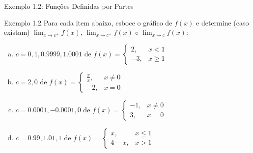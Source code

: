 \documentclass[10pt,aspectratio=169]{beamer}
\begin{document}
\begin{frame}{Exemplo 1.2: Funções Definidas por Partes}
    \transfade
    \begin{exampleblock}{Exemplo 1.2}
        Para cada item abaixo, esboce o gráfico de $f(x)$ e determine (caso existam) $\lim_{x \to c^+} f(x)$, $\lim_{x \to c^-} f(x)$ e $\lim_{x \to c} f(x)$:
        \vspace{0.2cm}
        \begin{enumerate}[(a)]
            \item $c=0, 1, 0.9999, 1.0001$ de $f(x) = \begin{cases} 2, & x < 1 \\ -3, & x \ge 1 \end{cases}$
            \vspace{0.15cm}\pause
            \item $c=2, 0$ de $f(x) = \begin{cases} \frac{x}{x}, & x \neq 0 \\ -2, & x = 0 \end{cases}$
            \vspace{0.15cm}\pause
            \item $c=0.0001, -0.0001, 0$ de $f(x) = \begin{cases} -1, & x \neq 0 \\ 3, & x = 0 \end{cases}$
            \vspace{0.15cm}\pause
            \item $c=0.99, 1.01, 1$ de $f(x) = \begin{cases} x, & x \le 1 \\ 4-x, & x > 1 \end{cases}$
        \end{enumerate}
    \end{exampleblock}
\end{frame}
\end{document}
